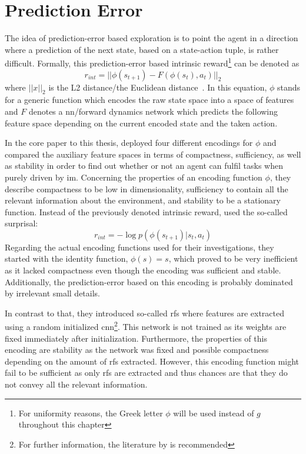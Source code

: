 \documentclass[draft,final]{vutinfth} %
\newcommand{\p}[1]{see p. #1}
\begin{document}
    \section{Prediction Error}\label{sec:prediction-error}

    The idea of prediction-error based exploration is to point the agent in a direction where a prediction of the next state, based on a state-action tuple, is rather difficult.
    Formally, this prediction-error based intrinsic reward\footnote{For uniformity reasons, the Greek letter $\phi$ will be used instead of $g$ throughout this chapter} can be denoted as
    \begin{equation}
        r_{int}=||\phi(s_{t+1})-F(\phi(s_t),a_t)||_2
    \end{equation}
    where $||x||_2$ is the L2 distance/the Euclidean distance~\citep{aubret_survey_2019}.
    In this equation, $\phi$ stands for a generic function which encodes the raw state space into a space of features and $F$ denotes a \gls{nn}/forward dynamics network which predicts the following feature space depending on the current encoded state and the taken action.

    In the core paper to this thesis, \citet{burda_large-scale_2018-1} deployed four different encodings for $\phi$ and compared the auxiliary feature spaces in terms of compactness, sufficiency, as well as stability in order to find out whether or not an agent can fulfil tasks when purely driven by \gls{im}.
    Concerning the properties of an encoding function $\phi$, they describe compactness to be low in dimensionality, sufficiency to contain all the relevant information about the environment, and stability to be a stationary function.
    Instead of the previously denoted intrinsic reward, \citet{burda_large-scale_2018-1} used the so-called surprisal:
    \begin{equation}
        r_{int}=-\log p(\phi(s_{t+1})|s_t,a_t)
    \end{equation}
    Regarding the actual encoding functions used for their investigations, they started with the identity function, $\phi(s)=s$, which proved to be very inefficient as it lacked compactness even though the encoding was sufficient and stable.
    Additionally, the prediction-error based on this encoding is probably dominated by irrelevant small details.

    In contrast to that, they introduced so-called \glspl{rf} where features are extracted using a random initialized \gls{cnn}\footnote{For further information, the literature by \citet[\p{40ff}]{aggarwal_neural_2018} is recommended}.
    This network is not trained as its weights are fixed immediately after initialization.
    Furthermore, the properties of this encoding are stability as the network was fixed and possible compactness depending on the amount of \glspl{rf} extracted.
    However, this encoding function might fail to be sufficient as only \glspl{rf} are extracted and thus chances are that they do not convey all the relevant information.
\end{document}
